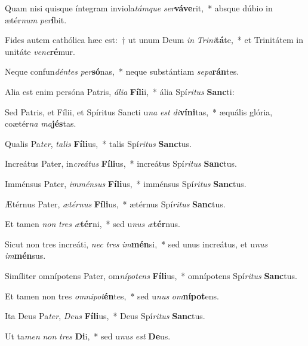 \item Quam nisi quisque íntegram inviola\textit{tám}\textit{que} \textit{ser}\textbf{vá}\textbf{ve}rit,~* absque dúbio in ætér\textit{num} \textit{per}\textbf{í}bit.
\item Fides autem cathólica hæc est:~† ut unum Deum \textit{in} \textit{Tri}\textit{ni}\textbf{tá}te,~* et Trinitátem in unitáte \textit{ve}\textit{ne}\textbf{ré}mur.
\item Neque confun\textit{dén}\textit{tes} \textit{per}\textbf{só}nas,~* neque substántiam \textit{se}\textit{pa}\textbf{rán}tes.
\item Alia est enim persóna Patris, \textit{á}\textit{li}\textit{a} \textbf{Fí}\textbf{li}i,~* ália Spí\textit{ri}\textit{tus} \textbf{Sanc}ti:
\item Sed Patris, et Fílii, et Spíritus Sancti u\textit{na} \textit{est} \textit{di}\textbf{ví}\textbf{ni}tas,~* æquális glória, coætér\textit{na} \textit{ma}\textbf{jés}tas.
\item Qualis Pa\textit{ter}, \textit{ta}\textit{lis} \textbf{Fí}\textbf{li}us,~* talis Spí\textit{ri}\textit{tus} \textbf{Sanc}tus.
\item Increátus Pater, in\textit{cre}\textit{á}\textit{tus} \textbf{Fí}\textbf{li}us,~* increátus Spí\textit{ri}\textit{tus} \textbf{Sanc}tus.
\item Imménsus Pater, \textit{im}\textit{mén}\textit{sus} \textbf{Fí}\textbf{li}us,~* imménsus Spí\textit{ri}\textit{tus} \textbf{Sanc}tus.
\item Ætérnus Pater, \textit{æ}\textit{tér}\textit{nus} \textbf{Fí}\textbf{li}us,~* ætérnus Spí\textit{ri}\textit{tus} \textbf{Sanc}tus.
\item Et tamen \textit{non} \textit{tres} \textit{æ}\textbf{tér}ni,~* sed u\textit{nus} \textit{æ}\textbf{tér}nus.
\item Sicut non tres increáti, \textit{nec} \textit{tres} \textit{im}\textbf{mén}si,~* sed unus increátus, et u\textit{nus} \textit{im}\textbf{mén}sus.
\item Simíliter omnípotens Pater, om\textit{ní}\textit{pot}\textit{ens} \textbf{Fí}\textbf{li}us,~* omnípotens Spí\textit{ri}\textit{tus} \textbf{Sanc}tus.
\item Et tamen non tres \textit{om}\textit{ni}\textit{pot}\textbf{én}tes,~* sed u\textit{nus} \textit{om}\textbf{ní}\textbf{pot}ens.
\item Ita Deus Pa\textit{ter}, \textit{De}\textit{us} \textbf{Fí}\textbf{li}us,~* Deus Spí\textit{ri}\textit{tus} \textbf{Sanc}tus.
\item Ut ta\textit{men} \textit{non} \textit{tres} \textbf{Di}i,~* sed u\textit{nus} \textit{est} \textbf{De}us.
